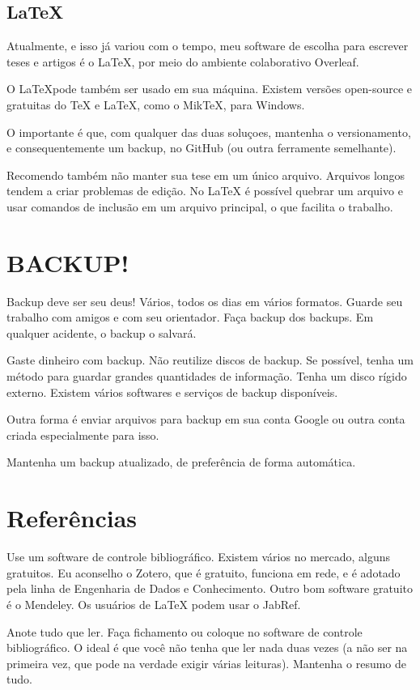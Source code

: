\subsection{\LaTeX}

Atualmente, e isso já variou com o tempo, meu software de escolha para escrever teses e artigos é o \LaTeX, por meio do ambiente colaborativo Overleaf. 

O \LaTeX pode também ser usado em sua máquina. Existem versões open-source e gratuitas do TeX e LaTeX, como o MikTeX, para Windows. 

O importante é que, com qualquer das duas soluçoes, mantenha o versionamento, e consequentemente um backup, no GitHub (ou outra ferramente semelhante).

Recomendo também não manter sua tese em um único arquivo. Arquivos longos tendem a criar problemas de edição. No LaTeX é possível quebrar um arquivo e usar comandos de inclusão em um arquivo principal, o que facilita o trabalho. 

\section{BACKUP!}

Backup deve ser seu deus! 
Vários, todos os dias em vários formatos. Guarde seu trabalho com amigos e com seu orientador. Faça backup dos backups. Em qualquer acidente, o backup o salvará. 

Gaste dinheiro com backup. Não reutilize discos de backup. Se possível, tenha um método para guardar grandes quantidades de informação. Tenha um disco rígido externo. 
Existem vários softwares e serviços de backup disponíveis. 

Outra forma é enviar arquivos para backup em sua conta Google ou outra conta criada especialmente para isso.

Mantenha um backup atualizado, de preferência de forma automática.


\section{Referências}

Use um software de controle bibliográfico. Existem vários no mercado, alguns gratuitos. Eu aconselho o Zotero, que é gratuito, funciona em rede, e é adotado pela linha de Engenharia de Dados e Conhecimento. Outro bom software gratuito é o Mendeley. 
Os usuários de LaTeX podem usar o JabRef.

Anote tudo que ler. Faça fichamento ou coloque no software de controle bibliográfico. 
O ideal é que você não tenha que ler nada duas vezes (a não ser na primeira vez, que pode na verdade exigir várias leituras). Mantenha o resumo de tudo. 

